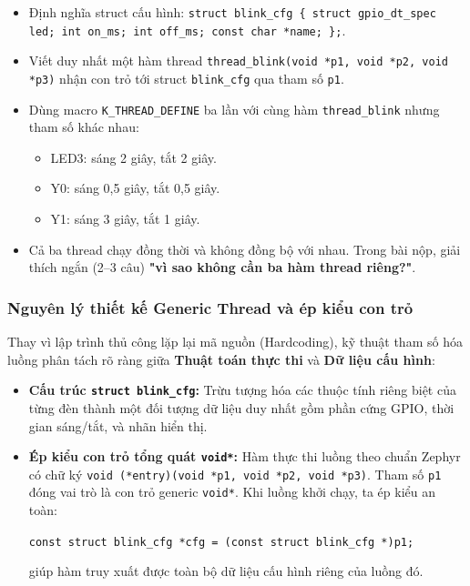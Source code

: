 \begin{tcolorbox}[
    enhanced,
    colback=black!2,
    colframe=black!60,
    boxrule=1pt,
    arc=2.5mm,
    drop shadow,
    attach boxed title to top left={xshift=4mm, yshift=-3mm},
    boxed title style={
        enhanced,
        colback=black!85,
        colframe=black!85,
        boxrule=1pt,
        arc=2.5mm,
        drop shadow,
        left=6pt, right=6pt, top=2pt, bottom=2pt
    },
    title=\textcolor{white}{\large\textbf{Yêu cầu đề bài (Trích phiếu bài tập)}}
]
\bfseries
\vspace{0.2cm}
\begin{itemize}
    \item Định nghĩa struct cấu hình: \texttt{struct blink\_cfg \{ struct gpio\_dt\_spec led; int on\_ms; int off\_ms; const char *name; \};}.
    \item Viết duy nhất một hàm thread \texttt{thread\_blink(void *p1, void *p2, void *p3)} nhận con trỏ tới struct \texttt{blink\_cfg} qua tham số \texttt{p1}.
    \item Dùng macro \texttt{K\_THREAD\_DEFINE} ba lần với cùng hàm \texttt{thread\_blink} nhưng tham số khác nhau:
    \begin{itemize}
        \item LED3: sáng 2 giây, tắt 2 giây.
        \item Y0: sáng 0,5 giây, tắt 0,5 giây.
        \item Y1: sáng 3 giây, tắt 1 giây.
    \end{itemize}
    \item Cả ba thread chạy đồng thời và không đồng bộ với nhau. Trong bài nộp, giải thích ngắn (2–3 câu) \textbf{"vì sao không cần ba hàm thread riêng?"}.
\end{itemize}
\end{tcolorbox}

\vspace{0.3cm}
\subsubsection{Nguyên lý thiết kế Generic Thread và ép kiểu con trỏ}
Thay vì lập trình thủ công lặp lại mã nguồn (Hardcoding), kỹ thuật tham số hóa luồng phân tách rõ ràng giữa \textbf{Thuật toán thực thi} và \textbf{Dữ liệu cấu hình}:
\begin{itemize}
    \item \textbf{Cấu trúc \texttt{struct blink\_cfg}:} Trừu tượng hóa các thuộc tính riêng biệt của từng đèn thành một đối tượng dữ liệu duy nhất gồm phần cứng GPIO, thời gian sáng/tắt, và nhãn hiển thị.
    \item \textbf{Ép kiểu con trỏ tổng quát \texttt{void*}:} Hàm thực thi luồng theo chuẩn Zephyr có chữ ký \texttt{void (*entry)(void *p1, void *p2, void *p3)}. Tham số \texttt{p1} đóng vai trò là con trỏ generic \texttt{void*}. Khi luồng khởi chạy, ta ép kiểu an toàn:
    \begin{center}
    \texttt{const struct blink\_cfg *cfg = (const struct blink\_cfg *)p1;}
    \end{center}
    giúp hàm truy xuất được toàn bộ dữ liệu cấu hình riêng của luồng đó.
\end{itemize}

